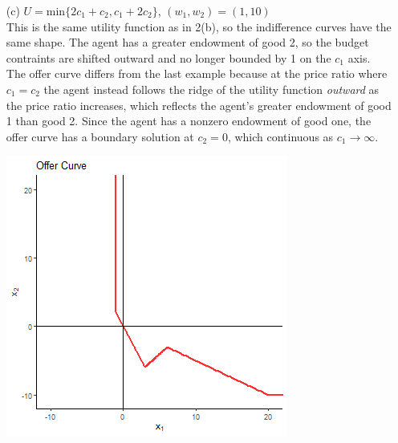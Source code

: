 \documentclass{article}
\begin{document}
\begin{itemize}
	
	\item[(c)] $U=\text{min}\{2c_1+c_2,c_1+2c_2\}$, $(w_1,w_2)=(1,10)$
		\smallskip \\
		This is the same utility function as in 2(b), so the indifference curves have the same shape. The agent has a greater endowment of good 2, so the budget contraints are shifted outward and no longer bounded by 1 on the $c_1$ axis. The offer curve differs from the last example because at the price ratio where $c_1=c_2$ the agent instead follows the ridge of the utility function \textit{outward} as the price ratio increases, which reflects the agent's greater endowment of good 1 than good 2. Since the agent has a nonzero endowment of good one, the offer curve has a boundary solution at $c_2=0$, which continuous as $c_1\rightarrow\infty$.
		\begin{center}
			\includegraphics[scale=.6]{2c_offer-curve.png}
		\end{center}
		
	
\end{itemize}



\end{document}
